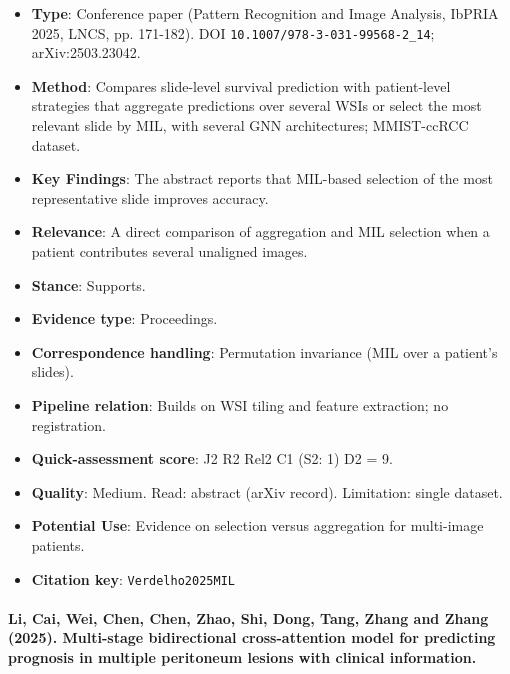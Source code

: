 \documentclass[journal,onecolumn]{IEEEtran}
\begin{document}
\begin{itemize}

\item{} \textbf{Type}: Conference paper (Pattern Recognition and Image Analysis, IbPRIA 2025, LNCS, pp. 171-182). DOI \nolinkurl{10.1007/978-3-031-99568-2_14}; arXiv:2503.23042.

\item{} \textbf{Method}: Compares slide-level survival prediction with patient-level strategies that aggregate predictions over several WSIs or select the most relevant slide by MIL, with several GNN architectures; MMIST-ccRCC dataset.

\item{} \textbf{Key Findings}: The abstract reports that MIL-based selection of the most representative slide improves accuracy.

\item{} \textbf{Relevance}: A direct comparison of aggregation and MIL selection when a patient contributes several unaligned images.

\item{} \textbf{Stance}: Supports.

\item{} \textbf{Evidence type}: Proceedings.

\item{} \textbf{Correspondence handling}: Permutation invariance (MIL over a patient's slides).

\item{} \textbf{Pipeline relation}: Builds on WSI tiling and feature extraction; no registration.

\item{} \textbf{Quick-assessment score}: J2 R2 Rel2 C1 (S2: 1) D2 = 9.

\item{} \textbf{Quality}: Medium. Read: abstract (arXiv record). Limitation: single dataset.

\item{} \textbf{Potential Use}: Evidence on selection versus aggregation for multi-image patients.

\item{} \textbf{Citation key}: \texttt{Verdelho2025MIL}

\end{itemize}

\paragraph{Li, Cai, Wei, Chen, Chen, Zhao, Shi, Dong, Tang, Zhang and Zhang (2025). Multi-stage bidirectional cross-attention model for predicting prognosis in multiple peritoneum lesions with clinical information.~\cite{Li2025MultiStage}}\mbox{}
\end{document}
